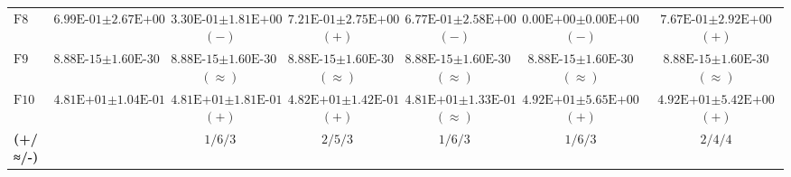 \begin{table}[htbp]
\begin{tabular}{lcccccc}
$\text{F8}$ & $\text{6.99E-01}\pm\text{2.67E+00}$ & $\text{3.30E-01}\pm\text{1.81E+00}$ $(-)$ & $\text{7.21E-01}\pm\text{2.75E+00}$ $(+)$ & $\text{6.77E-01}\pm\text{2.58E+00}$ $(-)$ & $\text{0.00E+00}\pm\text{0.00E+00}$ $(-)$ & $\text{7.67E-01}\pm\text{2.92E+00}$ $(+)$ \\
$\text{F9}$ & $\text{8.88E-15}\pm\text{1.60E-30}$ & $\text{8.88E-15}\pm\text{1.60E-30}$ $(\approx)$ & $\text{8.88E-15}\pm\text{1.60E-30}$ $(\approx)$ & $\text{8.88E-15}\pm\text{1.60E-30}$ $(\approx)$ & $\text{8.88E-15}\pm\text{1.60E-30}$ $(\approx)$ & $\text{8.88E-15}\pm\text{1.60E-30}$ $(\approx)$ \\
$\text{F10}$ & $\text{4.81E+01}\pm\text{1.04E-01}$ & $\text{4.81E+01}\pm\text{1.81E-01}$ $(+)$ & $\text{4.82E+01}\pm\text{1.42E-01}$ $(+)$ & $\text{4.81E+01}\pm\text{1.33E-01}$ $(\approx)$ & $\text{4.92E+01}\pm\text{5.65E+00}$ $(+)$ & $\text{4.92E+01}\pm\text{5.42E+00}$ $(+)$ \\
\textbf{(+/≈/-)} &  & \textbf{$\text{1/6/3}$} & \textbf{$\text{2/5/3}$} & \textbf{$\text{1/6/3}$} & \textbf{$\text{1/6/3}$} & \textbf{$\text{2/4/4}$} \\
\bottomrule
\end{tabular}
\endgroup
\end{table}
